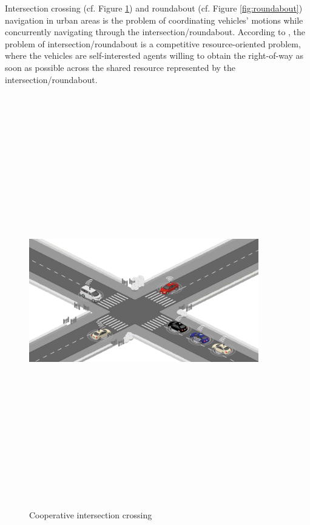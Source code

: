 Intersection crossing (cf. Figure \ref{fig:intersection}) and roundabout (cf. Figure \ref{fig:roundabout}) navigation in urban areas is the problem of coordinating vehicles' motions while concurrently navigating through the intersection/roundabout. According to \cite{mariani2021coordination}, the problem of intersection/roundabout is a competitive resource-oriented problem, where the vehicles are self-interested agents willing to obtain the right-of-way as soon as possible across the shared resource represented by the intersection/roundabout.  


        \begin{figure}[!h]
        \centering 
        \includegraphics[width=10cm,height=18cm,keepaspectratio]{chapters/Chapitre_2/Figures/Intersection.PNG}
        \caption{Cooperative intersection crossing}
        \label{fig:intersection}
        \end{figure}

